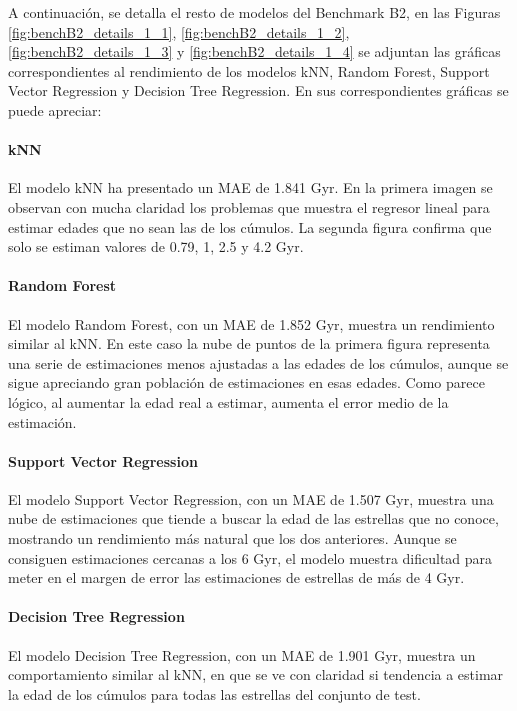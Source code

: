 A continuación, se detalla el resto de modelos del Benchmark B2, en las Figuras \ref{fig:benchB2_details_1_1}, \ref{fig:benchB2_details_1_2}, \ref{fig:benchB2_details_1_3} y \ref{fig:benchB2_details_1_4} se adjuntan las gráficas correspondientes al rendimiento de los modelos kNN, Random Forest, Support Vector Regression y Decision Tree Regression. En sus correspondientes gráficas se puede apreciar:

\paragraph{kNN} 
El modelo kNN ha presentado un MAE de 1.841 Gyr. En la primera imagen se observan con mucha claridad los problemas que muestra el regresor lineal para estimar edades que no sean las de los cúmulos. La segunda figura confirma que solo se estiman valores de 0.79, 1, 2.5 y 4.2 Gyr. %

\paragraph{Random Forest} 
El modelo Random Forest, con un MAE de 1.852 Gyr, muestra un rendimiento similar al kNN. En este caso la nube de puntos de la primera figura representa una serie de estimaciones menos ajustadas a las edades de los cúmulos, aunque se sigue apreciando gran población de estimaciones en esas edades. Como parece lógico, al aumentar la edad real a estimar, aumenta el error medio de la estimación. %

\paragraph{Support Vector Regression} 
El modelo Support Vector Regression, con un MAE de 1.507 Gyr, muestra una nube de estimaciones que tiende a buscar la edad de las estrellas que no conoce, mostrando un rendimiento más natural que los dos anteriores. Aunque se consiguen estimaciones cercanas a los 6 Gyr, el modelo muestra dificultad para meter en el margen de error las estimaciones de estrellas de más de 4 Gyr. %


\paragraph{Decision Tree Regression} 
El modelo Decision Tree Regression, con un MAE de 1.901 Gyr, muestra un comportamiento similar al kNN, en que se ve con claridad si tendencia a estimar la edad de los cúmulos para todas las estrellas del conjunto de test. %

